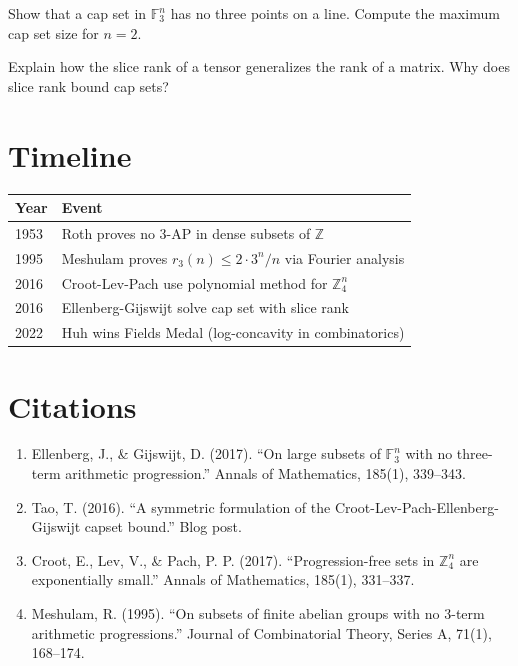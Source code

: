 \begin{exercise}[Basic]
Show that a cap set in $\mathbb{F}_3^n$ has no three points on a line. Compute the maximum cap set size for $n=2$.
\end{exercise}

\begin{exercise}[Intermediate]
Explain how the slice rank of a tensor generalizes the rank of a matrix. Why does slice rank bound cap sets?
\end{exercise}

\section{Timeline}

\begin{tabularx}{\linewidth}{lX}
\toprule
\textbf{Year} & \textbf{Event} \\ \midrule
1953 & Roth proves no 3-AP in dense subsets of $\mathbb{Z}$ \\
1995 & Meshulam proves $r_3(n) \le 2 \cdot 3^n / n$ via Fourier analysis \\
2016 & Croot-Lev-Pach use polynomial method for $\mathbb{Z}_4^n$ \\
2016 & Ellenberg-Gijswijt solve cap set with slice rank \\
2022 & Huh wins Fields Medal (log-concavity in combinatorics) \\
\bottomrule
\end{tabularx}

\section{Citations}

\begin{enumerate}
\item Ellenberg, J., \& Gijswijt, D. (2017). ``On large subsets of $\mathbb{F}_3^n$ with no three-term arithmetic progression.'' Annals of Mathematics, 185(1), 339--343.
\item Tao, T. (2016). ``A symmetric formulation of the Croot-Lev-Pach-Ellenberg-Gijswijt capset bound.'' Blog post.
\item Croot, E., Lev, V., \& Pach, P. P. (2017). ``Progression-free sets in $\mathbb{Z}_4^n$ are exponentially small.'' Annals of Mathematics, 185(1), 331--337.
\item Meshulam, R. (1995). ``On subsets of finite abelian groups with no 3-term arithmetic progressions.'' Journal of Combinatorial Theory, Series A, 71(1), 168--174.
\end{enumerate}
